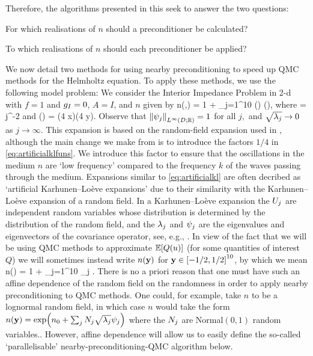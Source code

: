 Therefore, the algorithms presented in this  seek to answer the two questions:
\ben
\item For which realisations of $n$ should a preconditioner be calculated?
  \item To which realisations of $n$ should each preconditioner be applied?
\een

We now detail two methods for using nearby preconditioning to speed up QMC methods for the Helmholtz equation. To apply these methods, we use the following model problem: We consider the Interior Impedance Problem in 2-d with $f=1$ and $g_{I}=0$, $A = I$, and $n$ given by
\beq\label{eq:artificialkl}
n(\omega,\bx) = 1 + \sum_{j=1}^{10} \Uj(\omega) \sqrt{\lambdaj} \psij(\bx),
\eeq
where
\beq\label{eq:artificialkllambdas}
\sqrt{\lambdaj} = j^{-2}
\eeq
and
\beq\label{eq:artificialklfuns}
\psij(\bx) = \cos\mleft(4 x\mright)\cos\mleft(4 y\mright).
\eeq
Observe that $\NLiDRR{\psij}=1$ for all $j,$ and $\sqrt{\lambda_{j}} \rightarrow 0$ as $j \rightarrow \infty.$ This expansion is based on the random-field expansion used in \cite[Section 5.1]{GiGrKuScSl:19}, although the main change we make from \cite{GiGrKuScSl:19} is to introduce the factors $1/4$ in \cref{eq:artificialklfuns}. We introduce this factor to ensure that the oscillations in the medium $n$ are `low frequency' compared to the frequency $k$ of the waves passing through the medium. Expansions similar to \cref{eq:artificialkl} are often decribed as `artificial Karhunen--Lo\`eve expansions' due to their similarity with the Karhunen--Lo\`eve expansion of a random field. In a Karhunen--Lo\`eve expansion the $U_{j}$ are independent random variables whose distribution is determined by the distribution of the random field, and the $\lambda_{j}$ and $\psi_{j}$ are the eigenvalues and eigenvectors of the covariance operator, see, e.g., \cite[Section 7.4]{LoPoSh:14}. In view of the fact that we will be using QMC methods to approximate $\EXP{Q(u)}$ (for some quantities of interest $Q$) we will sometimes instead write $n(\mathbf{y})$ for $\by \in \cube{10}$, by which we mean
\beqs
n(\by) = 1 + \sum_{j=1}^{10} \by_{j} \sqrt{\lambdaj} \psij.
\eeqs
There is no a priori reason that one must have such an affine dependence of the random field on the randomness in order to apply nearby preconditioning to QMC methods. One could, for example, take $n$ to be a lognormal random field, in which case $n$ would take the form $n(\by) = \exp\mleft(\nz + \sum_j \Nj \sqrt{\lambdaj} \psij\mright)$ where the $N_{j}$ are Normal$(0,1)$ random variables.. However, affine dependence will allow us to easily define the so-called `parallelisable' nearby-preconditioning-QMC algorithm below.

